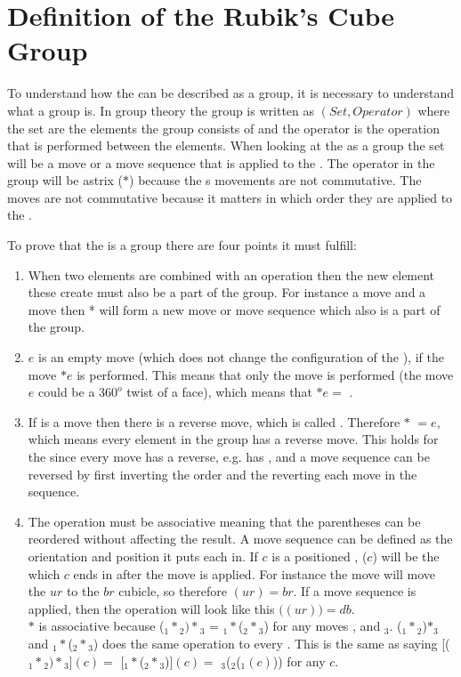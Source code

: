 \section{Definition of the Rubik's Cube Group}
\label{sec:groupDefinition}
To understand how the \rubik{} can be described as a group, it is necessary to understand what a group is.
In group theory the group is written as $(Set, Operator)$ where the set are the elements the group consists of and the operator is the operation that is performed between the elements. When looking at the \rubik{} as a group the set will be a move or a move sequence that is applied to the \rubik{}. The operator in the \rubik{} group will be astrix ($*$) because the \rubik{}s movements are not commutative. The moves are not commutative because it matters in which order they are applied to the \rubik{} \cite[p. 157]{Rubik87}.

To prove that the \rubik{} is a group there are four points it must fulfill:
\begin {enumerate}
\item When two elements are combined with an operation then the new element these create must also be a part of the group. For instance a move  and a move  then  *  will form a new move or move sequence which also is a part of the group.

\item $e$ is an empty move (which does not change the configuration of the \rubik{}), if the move $* e$ is performed. This means that only the move  is performed (the move $e$ could be a $360^o$ twist of a face), which means that $*e=$ .

\item If  is a move then there is a reverse move, which is called . Therefore $*$ $= e$, which means every element in the group has a reverse move. This holds for the \rubik{} since every move has a reverse, e.g.  has , and a move sequence can be reversed by first inverting the order and the reverting each move in the sequence.

\item The operation must be associative meaning that the parentheses can be reordered without affecting the result. A move sequence can be defined as the orientation and position it puts each \cpiece{} in. If $c$ is a positioned \cubie{}, ($c$) will be the \cubicle{} which $c$ ends in after the move is applied. For instance the move  will move the $ur$ \cubie{} to the $br$ cubicle, so therefore $(ur)=br$. If a move sequence is applied, then the operation will look like this $($$(ur))=db$.\\
$*$ is associative because ($_1*$$_2)*$$_3$ = $_1 *$($_2 *$$_3$) for any moves ,  and $_3$. ($_1 *$$_2$)$*$$_3$ and $_1 *$($_2 *$$_3$) does the same operation to every \cubie{}. This is the same as saying [($_1 *$$_2 )*$$_3$]$(c)=$ [$_1 *$($_2 *$$_3$)]$(c)=$ $_3$($_2$($_1 (c)$)) for any \cubie{} $c$.
\end {enumerate}

